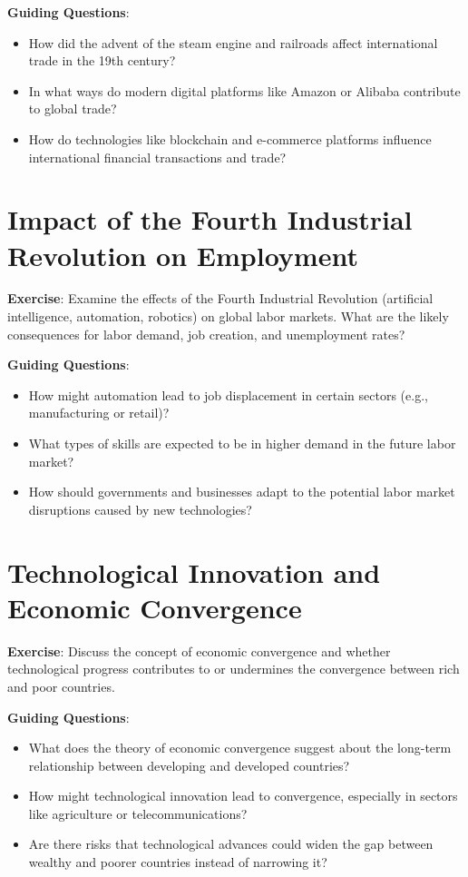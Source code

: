 \documentclass{article}
\begin{document}
\textbf{Guiding Questions}:
\begin{itemize}
    \item How did the advent of the steam engine and railroads affect international trade in the 19th century?
    \item In what ways do modern digital platforms like Amazon or Alibaba contribute to global trade?
    \item How do technologies like blockchain and e-commerce platforms influence international financial transactions and trade?
\end{itemize}

\section{Impact of the Fourth Industrial Revolution on Employment}
\textbf{Exercise}: Examine the effects of the Fourth Industrial Revolution (artificial intelligence, automation, robotics) on global labor markets. What are the likely consequences for labor demand, job creation, and unemployment rates?

\textbf{Guiding Questions}:
\begin{itemize}
    \item How might automation lead to job displacement in certain sectors (e.g., manufacturing or retail)?
    \item What types of skills are expected to be in higher demand in the future labor market?
    \item How should governments and businesses adapt to the potential labor market disruptions caused by new technologies?
\end{itemize}

\section{Technological Innovation and Economic Convergence}
\textbf{Exercise}: Discuss the concept of economic convergence and whether technological progress contributes to or undermines the convergence between rich and poor countries.

\textbf{Guiding Questions}:
\begin{itemize}
    \item What does the theory of economic convergence suggest about the long-term relationship between developing and developed countries?
    \item How might technological innovation lead to convergence, especially in sectors like agriculture or telecommunications?
    \item Are there risks that technological advances could widen the gap between wealthy and poorer countries instead of narrowing it?
\end{itemize}
\end{document}
